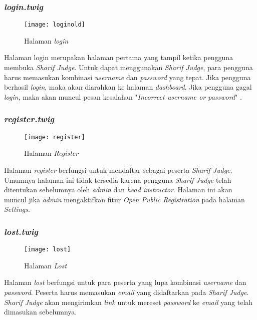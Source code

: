 \subsubsection{\textit{login.twig}}
\begin{figure}[H]
	\centering  
	\texttt{[image: loginold]}  
	\caption[Halaman \textit{Login}]{Halaman \textit{login}} 
	\label{fig:oldlogin} 
\end{figure} 
Halaman login merupakan halaman pertama yang tampil ketika pengguna membuka \textit{Sharif Judge}. Untuk dapat menggunakan \textit{Sharif Judge}, para pengguna harus memasukan kombinasi \textit{username} dan \textit{password} yang tepat. Jika pengguna berhasil \textit{login}, maka akan diarahkan ke halaman \textit{dashboard}. Jika pengguna gagal \textit{login}, maka akan muncul pesan kesalahan "\textit{Incorrect username or password}" .

\subsubsection{\textit{register.twig}}
\begin{figure}[H]
	\centering  
	\texttt{[image: register]}  
	\caption[Halaman \textit{Register}]{Halaman \textit{Register}} 
	\label{fig:register} 
\end{figure} 
Halaman \textit{register} berfungsi untuk mendaftar sebagai peserta \textit{Sharif Judge}. Umumnya halaman ini tidak tersedia karena pengguna \textit{Sharif Judge} telah ditentukan sebelumnya oleh \textit{admin} dan \textit{head instructor}. Halaman ini akan muncul jika \textit{admin} mengaktifkan fitur \textit{Open Public Registration} pada halaman \textit{Settings}.

\subsubsection{\textit{lost.twig}}
\begin{figure}[H]
	\centering  
	\texttt{[image: lost]}  
	\caption[Halaman \textit{Lost}]{Halaman \textit{Lost}} 
	\label{fig:lost} 
\end{figure} 
Halaman \textit{lost} berfungsi untuk para peserta yang lupa kombinasi \textit{username} dan \textit{password}. Peserta harus memasukan \textit{email} yang didaftarkan pada \textit{Sharif Judge}. \textit{Sharif Judge} akan mengirimkan \textit{link} untuk mereset \textit{password} ke \textit{email} yang telah dimasukan sebelumnya.

